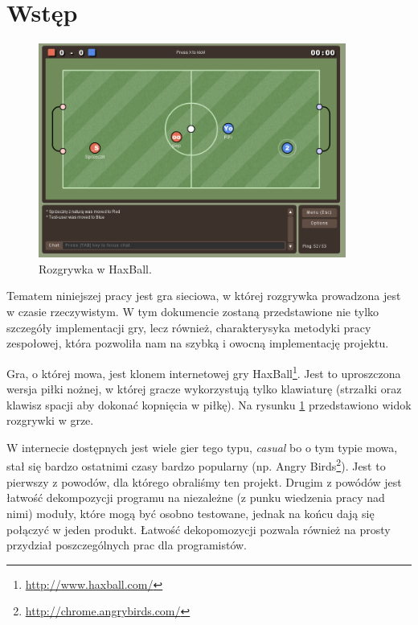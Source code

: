 \section{Wstęp}

\begin{figure}[ht]
    \centering
    \includegraphics[width=0.9\textwidth]{imgs/haxball.png}
    \caption{Rozgrywka w HaxBall.}
    \label{fig:haxball}
\end{figure}

Tematem niniejszej pracy jest gra sieciowa, w której rozgrywka prowadzona jest w czasie rzeczywistym. W tym dokumencie zostaną przedstawione nie tylko szczegóły implementacji gry, lecz również, charakterysyka metodyki pracy zespołowej, która pozwoliła nam na szybką i owocną implementację projektu.

Gra, o której mowa, jest klonem internetowej gry HaxBall\footnote{\url{http://www.haxball.com/}}. Jest to uproszczona wersja piłki nożnej, w której gracze wykorzystują tylko klawiaturę (strzałki oraz klawisz spacji aby dokonać kopnięcia w piłkę). Na rysunku \ref{fig:haxball} przedstawiono widok rozgrywki w grze.

W internecie dostępnych jest wiele gier tego typu, \emph{casual} bo o tym typie mowa, stał się bardzo ostatnimi czasy bardzo popularny (np. Angry Birds\footnote{\url{http://chrome.angrybirds.com/}}). Jest to pierwszy z powodów, dla którego obraliśmy ten projekt. Drugim z powódów jest łatwość dekompozycji programu na niezależne (z punku wiedzenia pracy nad nimi) moduły, które mogą być osobno testowane, jednak na końcu dają się połączyć w jeden produkt. Łatwość dekopomozycji pozwala również na prosty przydział poszczególnych prac dla programistów.




